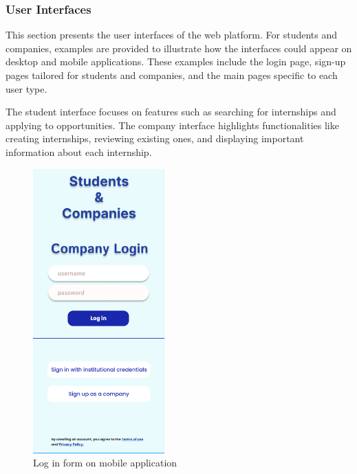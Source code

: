 \subsubsection{User Interfaces}

This section presents the user interfaces of the web platform. For students and companies, examples are provided to illustrate how the interfaces could appear on desktop and mobile applications. These examples include the login page, sign-up pages tailored for students and companies, and the main pages specific to each user type.

The student interface focuses on features such as searching for internships and applying to opportunities. The company interface highlights functionalities like creating internships, reviewing existing ones, and displaying important information about each internship.


\bigskip

\begin{figure}[ht]
    \centering
    \includegraphics[width=0.45\textwidth]{RASD-Latex/assets/UI images/login_phone.png}
    \caption{Log in form on mobile application}
    \label{fig:image1}
\end{figure}


